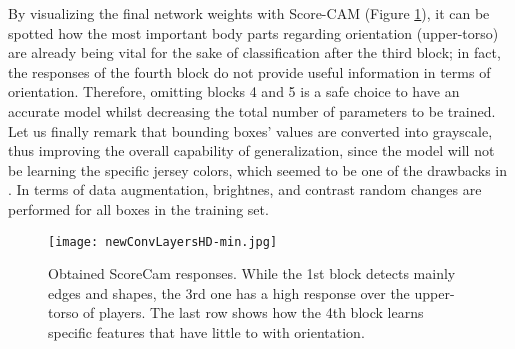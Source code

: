 \documentclass{article}
\begin{document}
By visualizing the final network weights with Score-CAM \cite{wang2020score} (Figure \ref{fig:weightViz}), it can be spotted how the most important body parts regarding orientation (upper-torso) are already being vital for the sake of classification after the third block; in fact, the responses of the fourth block do not provide useful information in terms of orientation. Therefore, omitting blocks 4 and 5 is a safe choice to have an accurate model whilst decreasing the total number of parameters to be trained. \\ 
Let us finally remark that bounding boxes' values are converted into grayscale, thus improving the overall capability of generalization, since the model will not be learning the specific jersey colors, which seemed to be one of the drawbacks in \cite{arbues2020always}. In terms of data augmentation, brightnes, and contrast random changes are performed for all boxes in the training set. 

\begin{figure}
\begin{center}
  \texttt{[image: newConvLayersHD-min.jpg]}
  \caption{Obtained ScoreCam responses. While the 1st block detects mainly edges and shapes, the 3rd one has a high response over the upper-torso of players. The last row shows how the 4th block learns specific features that have little to with orientation.}
  \label{fig:weightViz}
 \end{center}
\end{figure}

\begin{comment}
\begin{figure*}
\begin{center}
  \texttt{[image: lossesHD-min.jpg]}
  \caption{Losses.}
  \label{fig:losses}
 \end{center}
\end{figure*}
\end{comment}
\end{document}
